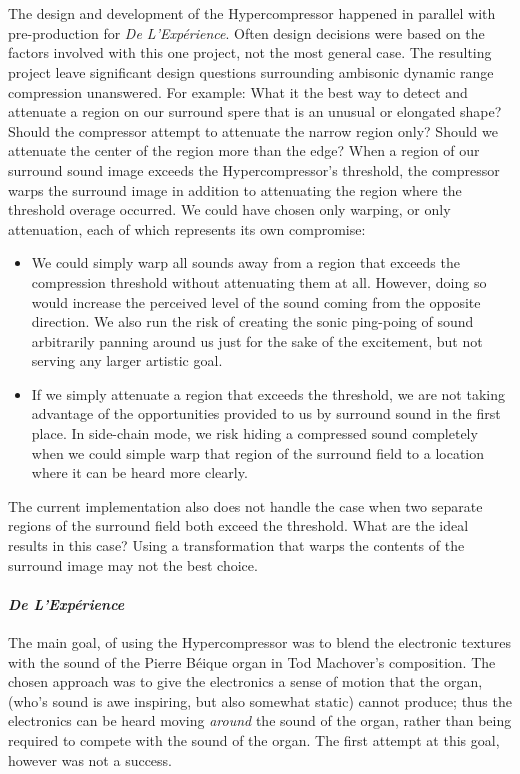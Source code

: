 \section{\thesis}
The design and development of the Hypercompressor happened in parallel
with pre-production for \textit{De L'Exp\'{e}rience}. Often design
decisions were based on the factors involved with this one project,
not the most general case. The resulting project leave significant
design questions surrounding ambisonic dynamic range compression
unanswered.  For example: What it the best way to detect and attenuate
a region on our surround spere that is an unusual or elongated shape?
Should the compressor attempt to attenuate the narrow region only?
Should we attenuate the center of the region more than the edge? When
a region of our surround sound image exceeds the Hypercompressor's
threshold, the compressor warps the surround image in addition to
attenuating the region where the threshold overage occurred. We could
have chosen only warping, or only attenuation, each of which
represents its own compromise:
\begin{itemize}
\item We could simply warp all sounds away from a region that exceeds
  the compression threshold without attenuating them at all. However,
  doing so would increase the perceived level of the sound coming from
  the opposite direction. We also run the risk of creating the sonic
  ping-poing of sound arbitrarily panning around us just for the sake
  of the excitement, but not serving any larger artistic goal. 
\item If we simply attenuate a region that exceeds the threshold, we
  are not taking advantage of the opportunities provided to us by
  surround sound in the first place. In side-chain mode, we risk
  hiding a compressed sound completely when we could simple warp that
  region of the surround field to a location where it can be heard
  more clearly.
\end{itemize}
The current implementation also does not handle the case when two
separate regions of the surround field both exceed the threshold. What
are the ideal results in this case? Using a transformation that warps
the contents of the surround image may not the best choice.

\paragraph{\textit{De L'Exp\'{e}rience}}
The main goal, of using the Hypercompressor was to blend the
electronic textures with the sound of the Pierre B\'{e}ique organ in
Tod Machover's composition. The chosen approach was to give the
electronics a sense of motion that the organ, (who's sound is awe
inspiring, but also somewhat static) cannot produce; thus the
electronics can be heard moving \emph{around} the sound of the organ,
rather than being required to compete with the sound of the organ.
The first attempt at this goal, however was not a success.

